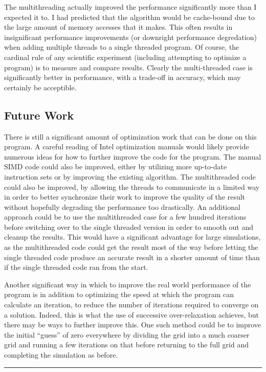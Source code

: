 The multithreading actually improved the performance significantly more than I expected it to.
I had predicted that the algorithm would be cache-bound due to the large amount of memory accesses
that it makes. This often results in insignificant performance improvements (or downright performance
degredation) when adding multiple threads to a single threaded program. Of course, the cardinal
rule of any scientific experiment (including attempting to optimize a program) is to measure and
compare results. Clearly the multi-threaded case is significantly better in performance, with a trade-off
in accuracy, which may certainly be acceptible.

\subsection{Future Work}

There is still a significant amount of optimization work that can be done on this program. A careful reading
of Intel optimization manuals would likely provide numerous ideas for how to further improve the code
for the program. The manual SIMD code could also be improved, either by utilizing more up-to-date instruction
sets or by improving the existing algorithm. The multithreaded code could also be improved, by allowing the threads
to communicate in a limited way in order to better synchronize their work to improve the quality of the result without
hopefully degrading the performance too drastically. An additional approach could be to use the multithreaded case for
a few hundred iterations before switching over to the single threaded version in order to smooth out and cleanup the
results. This would have a significant advantage for large simulations, as the multithreaded code could get the result
most of the way before letting the single threaded code produce an accurate result in a shorter amount of time than
if the single threaded code ran from the start.

Another significant way in which to improve the real world performance of the program is in addition to optimizing
the speed at which the program can calculate an iteration, to reduce the number of iterations required to
converge on a solution. Indeed, this is what the use of successive over-relaxation achieves, but there may be ways
to further improve this. One such method could be to improve the initial ``guess'' of zero everywhere by dividing
the grid into a much coarser grid and running a few iterations on that before returning to the full grid and completing
the simulation as before.

\begin{center}\rule{2cm}{0.4pt}\end{center}

